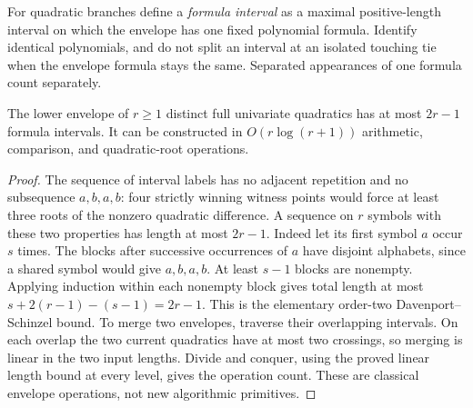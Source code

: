 For quadratic branches define a \emph{formula interval} as a maximal
positive-length interval on which the envelope has one fixed polynomial
formula. Identify identical polynomials, and do not split an interval at an
isolated touching tie when the envelope formula stays the same. Separated
appearances of one formula count separately.

\begin{lemma}\label{lem:DS}
The lower envelope of $r\ge1$ distinct full univariate quadratics has at most
$2r-1$ formula intervals. It can be constructed in $O(r\log(r+1))$
arithmetic, comparison, and quadratic-root operations.
\end{lemma}
\begin{proof}
The sequence of interval labels has no adjacent repetition and no subsequence
$a,b,a,b$: four strictly winning witness points would force at least three
roots of the nonzero quadratic difference. A sequence on $r$ symbols with
these two properties has length at most $2r-1$. Indeed let its first symbol
$a$ occur $s$ times. The blocks after successive occurrences of $a$ have
disjoint alphabets, since a shared symbol would give $a,b,a,b$. At least
$s-1$ blocks are nonempty. Applying induction within each nonempty block
gives total length at most $s+2(r-1)-(s-1)=2r-1$.
This is the elementary order-two Davenport--Schinzel bound.
To merge two envelopes, traverse their overlapping intervals. On each overlap
the two current quadratics have at most two crossings, so merging is linear
in the two input lengths. Divide and conquer, using the proved linear
length bound at every level, gives the operation count. These are classical
envelope operations, not new algorithmic primitives.
\end{proof}

